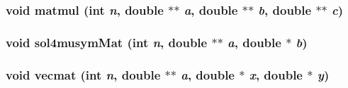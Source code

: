 \subsubsection{\setlength{\rightskip}{0pt plus 5cm}void matmul (int {\em n}, double $\ast$$\ast$ {\em a}, double $\ast$$\ast$ {\em b}, double $\ast$$\ast$ {\em c})}\label{matopt_8c_baa37d798e088183b609adf8af0a2f71}


\subsubsection{\setlength{\rightskip}{0pt plus 5cm}void sol4musym\-Mat (int {\em n}, double $\ast$$\ast$ {\em a}, double $\ast$ {\em b})}\label{matopt_8c_21041e316ded62459cb49f9a0b0aa7d0}


\subsubsection{\setlength{\rightskip}{0pt plus 5cm}void vecmat (int {\em n}, double $\ast$$\ast$ {\em a}, double $\ast$ {\em x}, double $\ast$ {\em y})}\label{matopt_8c_4fbb371d5ad2e326f2b8820323f20fa5}


